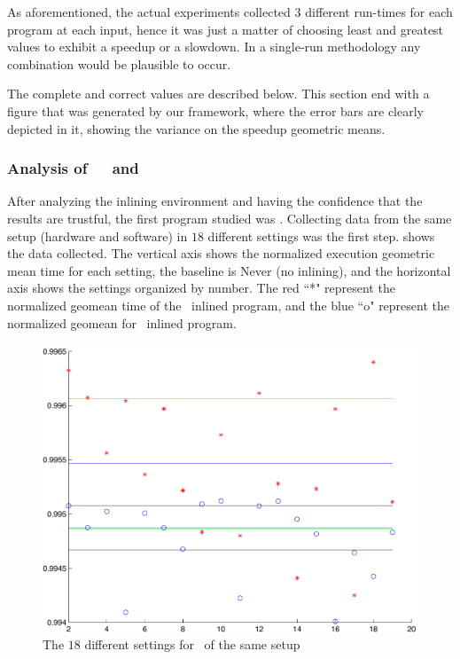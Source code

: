 As aforementioned, the actual experiments collected $3$ different run-times for each program at each input, hence it was just a matter of choosing least and greatest values to exhibit a speedup or a slowdown. In a single-run methodology any combination would be plausible to occur.

The complete and correct values are described below. This section end with a figure that was generated by our framework, where the error bars are clearly depicted in it, showing the variance on the speedup geometric means.

\subsubsection{Analysis of\ \ \bzip\  and  \gzip}

After analyzing the inlining environment and having the confidence that the results are trustful, the first program studied was \bzip. Collecting data from the same setup (hardware and software) in $18$ different settings was the first step.  shows the data collected. The vertical axis shows the normalized execution geometric mean time for each setting, the baseline is Never (no inlining), and the horizontal axis shows the settings organized by number. The red ``*" represent the normalized geomean time of the \FDI\ inlined program, and the blue ``o" represent the normalized geomean for \llvm\ inlined program.

\begin{figure}
  \centering
  \includegraphics[width=1.00\linewidth]{Figures/fdllrep}
  \caption{The $18$ different settings for \bzip\ of the same setup}
  \label{fig:fdllrep}
\end{figure}

